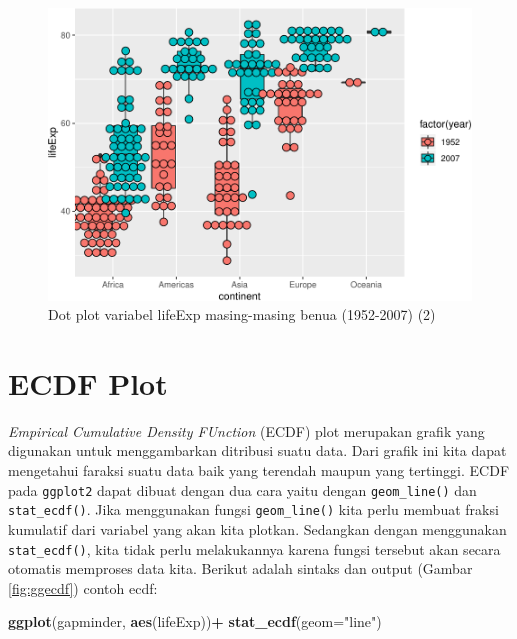 \documentclass[]{book}
\newenvironment{Shaded}{\begin{snugshade}}{\end{snugshade}}
\newcommand{\KeywordTok}[1]{\textcolor[rgb]{0.13,0.29,0.53}{\textbf{#1}}}
\newcommand{\DataTypeTok}[1]{\textcolor[rgb]{0.13,0.29,0.53}{#1}}
\newcommand{\StringTok}[1]{\textcolor[rgb]{0.31,0.60,0.02}{#1}}
\newcommand{\OperatorTok}[1]{\textcolor[rgb]{0.81,0.36,0.00}{\textbf{#1}}}
\newcommand{\NormalTok}[1]{#1}
\begin{document}
\begin{figure}

{\centering \includegraphics[width=0.7\linewidth]{EnvStat_files/figure-latex/dotplot2-1} 

}

\caption{Dot plot variabel lifeExp masing-masing benua (1952-2007) (2)}\label{fig:dotplot2}
\end{figure}

\section{ECDF Plot}\label{ecdf-plot}

\emph{Empirical Cumulative Density FUnction} (ECDF) plot merupakan
grafik yang digunakan untuk menggambarkan ditribusi suatu data. Dari
grafik ini kita dapat mengetahui faraksi suatu data baik yang terendah
maupun yang tertinggi. ECDF pada \texttt{ggplot2} dapat dibuat dengan
dua cara yaitu dengan \texttt{geom\_line()} dan \texttt{stat\_ecdf()}.
Jika menggunakan fungsi \texttt{geom\_line()} kita perlu membuat fraksi
kumulatif dari variabel yang akan kita plotkan. Sedangkan dengan
menggunakan \texttt{stat\_ecdf()}, kita tidak perlu melakukannya karena
fungsi tersebut akan secara otomatis memproses data kita. Berikut adalah
sintaks dan output (Gambar \ref{fig:ggecdf}) contoh ecdf:

\begin{Shaded}
\begin{Highlighting}[]
\KeywordTok{ggplot}\NormalTok{(gapminder, }\KeywordTok{aes}\NormalTok{(lifeExp))}\OperatorTok{+}
\StringTok{  }\KeywordTok{stat_ecdf}\NormalTok{(}\DataTypeTok{geom=}\StringTok{"line"}\NormalTok{)}
\end{Highlighting}
\end{Shaded}
\end{document}
